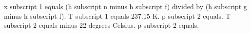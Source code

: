 x subscript 1 equals (h subscript n minus h subscript f) divided by (h subscript g minus h subscript f).  
T subscript 1 equals 237.15 K.  
p subscript 2 equals.  
T subscript 2 equals minus 22 degrees Celsius.  
p subscript 2 equals.